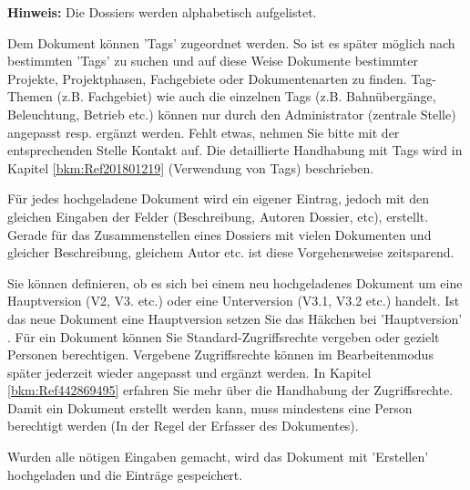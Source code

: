 \vspace{\baselineskip}

\textbf{Hinweis:} Die Dossiers werden alphabetisch aufgelistet.

\vspace{\baselineskip}

Dem Dokument können 'Tags'  zugeordnet werden. So ist es später möglich nach bestimmten 'Tags' zu suchen und auf diese Weise Dokumente bestimmter Projekte, Projektphasen, Fachgebiete oder Dokumentenarten zu finden. Tag-Themen (z.B. Fachgebiet) wie auch die einzelnen Tags (z.B. Bahnübergänge, Beleuchtung, Betrieb etc.) können nur durch den Administrator (zentrale Stelle) angepasst resp. ergänzt werden. Fehlt etwas, nehmen Sie bitte mit der entsprechenden Stelle Kontakt auf. Die detaillierte Handhabung mit Tags wird in Kapitel \ref{bkm:Ref201801219} (Verwendung von Tags) beschrieben. \newline

Für jedes hochgeladene Dokument wird ein eigener Eintrag, jedoch mit den gleichen Eingaben der Felder (Beschreibung, Autoren Dossier, etc), erstellt. Gerade für das Zusammenstellen eines Dossiers mit vielen Dokumenten und gleicher Beschreibung, gleichem Autor etc. ist diese Vorgehensweise zeitsparend. 


Sie können definieren, ob es sich bei einem neu hochgeladenes Dokument um eine Hauptversion (V2, V3. etc.) oder eine Unterversion (V3.1, V3.2 etc.) handelt. Ist das neue Dokument eine Hauptversion setzen Sie das Häkchen bei 'Hauptversion' . Für ein Dokument können Sie Standard-Zugriffsrechte vergeben  oder gezielt Personen berechtigen. Vergebene Zugriffsrechte können im Bearbeitenmodus später jederzeit wieder angepasst und ergänzt werden. In Kapitel \ref{bkm:Ref442869495} erfahren Sie mehr über die Handhabung der Zugriffsrechte. Damit ein Dokument erstellt werden kann, muss mindestens eine Person berechtigt werden (In der Regel der Erfasser des Dokumentes).

Wurden alle nötigen Eingaben gemacht, wird das Dokument mit 'Erstellen'  hochgeladen und die Einträge gespeichert. \newline

